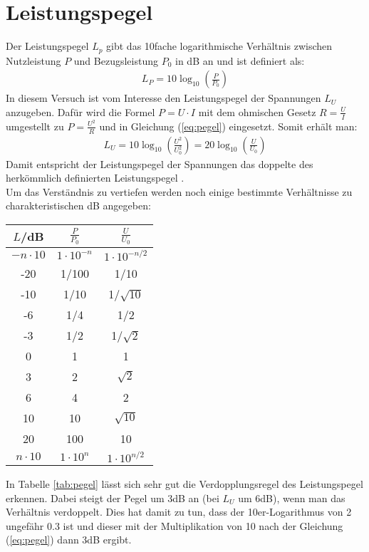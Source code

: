 \section{Leistungspegel}
Der Leistungspegel $L_p$ gibt das 10fache logarithmische Verhältnis zwischen Nutzleistung $P$ und Bezugsleistung $P_0$ in \si{\deci\bel} an und ist definiert als:
\begin{gather}
    L_P = 10 \log_{10}\left(\frac{P}{P_0}\right)
    \label{eq:pegel}
\end{gather}
In diesem Versuch ist vom Interesse den Leistungspegel der Spannungen $L_U$ anzugeben. Dafür wird die Formel $P = U \cdot I$ mit dem ohmischen Gesetz $R = \frac{U}{I}$ umgestellt zu $P = \frac{U^2}{R}$ und in Gleichung (\ref{eq:pegel}) eingesetzt. Somit erhält man:
\begin{gather}
    L_U = 10 \log_{10}\left(\frac{U^2}{U_0^2}\right) = 20 \log_{10}\left(\frac{U}{U_0}\right)
\end{gather}
Damit entspricht der Leistungspegel der Spannungen das doppelte des herkömmlich definierten Leistungspegel \citep{electronik}.\\
Um das Verständnis zu vertiefen werden noch einige bestimmte Verhältnisse zu charakteristischen \si{\deci\bel} angegeben:
\begin{center}
    \begin{tabular}{c | c c}
        $L$/dB & $\frac{P}{P_0}$ & $\frac{U}{U_0}$\\
        \hline
        $-n\cdot10$ & $1\cdot10^{-n}$ &  $1\cdot10^{-n/2}$ \\
        -20 & 1/100 & 1/10 \\
        -10 & 1/10 & 1/$\sqrt{10}$ \\
        -6 & 1/4 & 1/2\\
        -3 & 1/2 & 1/$\sqrt{2}$\\
        0 & 1 & 1\\
        3 & 2 & $\sqrt{2}$\\
        6 & 4 & 2\\
        10 & 10 & $\sqrt{10}$ \\
        20 & 100 & 10 \\
        $n\cdot10$ & $1\cdot10^{n}$ &  $1\cdot10^{n/2}$ \\
    \end{tabular}
    \label{tab:pegel}
\end{center}
In Tabelle \ref{tab:pegel} lässt sich sehr gut die Verdopplungsregel des Leistungspegel erkennen. Dabei steigt der Pegel um 3dB an (bei $L_U$ um 6dB), wenn man das Verhältnis verdoppelt. Dies hat damit zu tun, dass der 10er-Logarithmus von 2 ungefähr 0.3 ist und dieser mit der Multiplikation von 10 nach der Gleichung (\ref{eq:pegel}) dann 3dB ergibt.
\newpage
